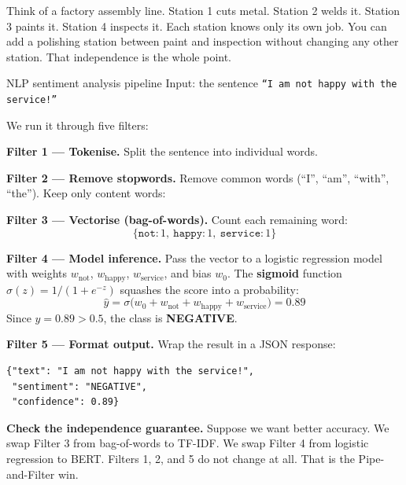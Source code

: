 \documentclass[a4paper,11pt]{article}
\newcommand{\vocab}[1]{\textbf{\color{navy}#1}}
\begin{document}
\begin{intuition}
Think of a factory assembly line. Station 1 cuts metal. Station 2 welds
it. Station 3 paints it. Station 4 inspects it. Each station knows only
its own job. You can add a polishing station between paint and inspection
without changing any other station. That independence is the whole point.
\end{intuition}

\begin{worked}{NLP sentiment analysis pipeline}
Input: the sentence \texttt{``I am not happy with the service!''}

We run it through five filters:
\begin{steps}
  \item \textbf{Filter 1 — Tokenise.}
        Split the sentence into individual words.
        \begin{equation*}
          [\texttt{``I''},\texttt{``am''},\texttt{``not''},\texttt{``happy''},
           \texttt{``with''},\texttt{``the''},\texttt{``service''},\texttt{``!''}]
        \end{equation*}
  \item \textbf{Filter 2 — Remove stopwords.}
        Remove common words (``I'', ``am'', ``with'', ``the'').
        Keep only content words:
        \begin{equation*}
          [\texttt{``not''},\texttt{``happy''},\texttt{``service''}]
        \end{equation*}
  \item \textbf{Filter 3 — Vectorise (bag-of-words).}
        Count each remaining word:
        \begin{equation*}
          \{\texttt{not}{:}1,\ \texttt{happy}{:}1,\ \texttt{service}{:}1\}
        \end{equation*}
  \item \textbf{Filter 4 — Model inference.}
        Pass the vector to a logistic regression model with weights
        $w_{\text{not}}$, $w_{\text{happy}}$, $w_{\text{service}}$,
        and bias $w_0$.
        The \vocab{sigmoid} function $\sigma(z) = 1/(1+e^{-z})$ squashes
        the score into a probability:
        \begin{equation*}
          \hat{y} = \sigma\!\bigl(w_0 + w_{\text{not}} + w_{\text{happy}}
                    + w_{\text{service}}\bigr) = 0.89
        \end{equation*}
        Since $\hat{y} = 0.89 > 0.5$, the class is \textbf{NEGATIVE}.
  \item \textbf{Filter 5 — Format output.}
        Wrap the result in a JSON response:
        \begin{verbatim}
{"text": "I am not happy with the service!",
 "sentiment": "NEGATIVE",
 "confidence": 0.89}
        \end{verbatim}
  \item \textbf{Check the independence guarantee.}
        Suppose we want better accuracy. We swap Filter 3 from
        bag-of-words to TF-IDF. We swap Filter 4 from logistic
        regression to BERT. Filters 1, 2, and 5 do not change at all.
        That is the Pipe-and-Filter win.
\end{steps}
\end{worked}
\end{document}
